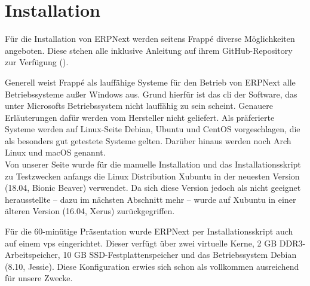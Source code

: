 \chapter{Installation}
\label{chap:inst}

Für die Installation von ERPNext werden seitens Frappé diverse Möglichkeiten angeboten. Diese stehen alle inklusive Anleitung auf ihrem GitHub-Repository zur Verfügung (\vgl \cite{GhBench}).

Generell weist Frappé als lauffähige Systeme für den Betrieb von ERPNext alle Betriebssysteme außer Windows aus. Grund hierfür ist das \gls{cli} der Software, das unter Microsofts Betriebssystem nicht lauffähig zu sein scheint. Genauere Erläuterungen dafür werden vom Hersteller nicht geliefert. Als präferierte Systeme werden auf Linux-Seite Debian, Ubuntu und CentOS vorgeschlagen, die als besonders gut getestete Systeme gelten. Darüber hinaus werden noch Arch Linux und macOS genannt. \\
Von unserer Seite wurde für die manuelle Installation und das Installationsskript zu Testzwecken anfangs die Linux Distribution Xubuntu in der neuesten Version (18.04, \glqq Bionic Beaver\grqq) verwendet. Da sich diese Version jedoch als nicht geeignet herausstellte – dazu im nächsten Abschnitt mehr – wurde auf Xubuntu in einer älteren Version (16.04, \glqqXenial Xerus\grqq) zurückgegriffen.
 
Für die 60-minütige Präsentation wurde ERPNext per Installationsskript auch auf einem \gls{vps} eingerichtet. Dieser verfügt über zwei virtuelle Kerne, 2 GB DDR3-Arbeitspeicher, 10 GB SSD-Festplattenspeicher und das Betriebssystem Debian (8.10, Jessie). Diese Konfiguration erwies sich schon als vollkommen ausreichend für unsere Zwecke.

